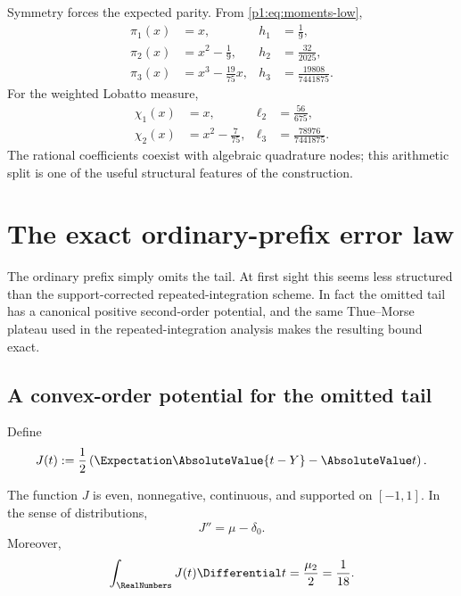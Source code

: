 \documentclass[11pt]{article}
\numberwithin{equation}{section}
\theoremstyle{definition}
\theoremstyle{remark}
\begin{document}
Symmetry forces the expected parity.  From \eqref{p1:eq:moments-low},
\begin{align}
 \pi_1(x)&=x,& h_1&=\frac19,\label{p1:eq:pi1}\\
 \pi_2(x)&=x^2-\frac19,& h_2&=\frac{32}{2025},\label{p1:eq:pi2}\\
 \pi_3(x)&=x^3-\frac{19}{75}x,& h_3&=\frac{19808}{7441875}.
 \label{p1:eq:pi3}
\end{align}
For the weighted Lobatto measure,
\begin{align}
 \chi_1(x)&=x,& \ell_2&=\frac{56}{675},\label{p1:eq:chi1}\\
 \chi_2(x)&=x^2-\frac7{75},& \ell_3&=\frac{78976}{7441875}.
 \label{p1:eq:chi2}
\end{align}
The rational coefficients coexist with algebraic quadrature nodes; this arithmetic split is one of the useful structural features of the construction.

\section{The exact ordinary-prefix error law}
\label{p1:sec:ordinary}

The ordinary prefix simply omits the tail.  At first sight this seems less structured than the support-corrected repeated-integration scheme.  In fact the omitted tail has a canonical positive second-order potential, and the same Thue--Morse plateau used in the repeated-integration analysis makes the resulting bound exact.

\subsection{A convex-order potential for the omitted tail}

Define
\begin{equation}
 J(t):=\frac12\left(\Expectation\AbsoluteValue{t-Y}-\AbsoluteValue t\right).
 \label{p1:eq:J-def}
\end{equation}

\begin{lemma}
\label{p1:lem:J}
The function $J$ is even, nonnegative, continuous, and supported on $[-1,1]$.  In the sense of distributions,
\begin{equation}
 J''=\mu-\delta_0.
 \label{p1:eq:J-second}
\end{equation}
Moreover,
\begin{equation}
 \int_{\RealNumbers}J(t)\Differential t=\frac{\mu_2}{2}=\frac1{18}.
 \label{p1:eq:J-mass}
\end{equation}
\end{lemma}
\end{document}
